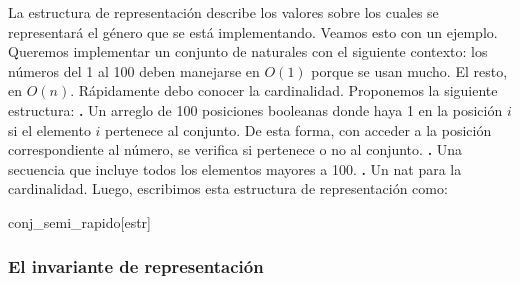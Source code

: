 \documentclass[10pt,a4paper]{article}
\begin{document}
La estructura de representación describe los valores sobre los cuales se representará el género que se está implementando.
\newline
\newline
Veamos esto con un ejemplo.
\newline
\newline
Queremos implementar un conjunto de naturales con el siguiente contexto: los números del 1 al 100 deben manejarse en $O(1)$ porque se usan mucho. El resto, en $O(n)$. Rápidamente debo conocer la cardinalidad.
\newline
\newline
Proponemos la siguiente estructura:
\newline
\newline
\textbf{.} Un arreglo de 100 posiciones booleanas donde haya 1 en la posición $i$ si el elemento $i$ pertenece al conjunto. De esta forma, con acceder a la posición correspondiente al número, se verifica si pertenece o no al conjunto. 
\newline
\newline
\textbf{.} Una secuencia que incluye todos los elementos mayores a 100.
\newline
\newline
\textbf{.} Un nat para la cardinalidad.
\newline
\newline
Luego, escribimos esta estructura de representación como:
\begin{Estructura}{conj\_semi\_rapido}[estr]
	\begin{Tupla}[estr]%
	\end{Tupla}
\end{Estructura}
\medskip
\medskip
\subsubsection{El invariante de representación}
\end{document}
